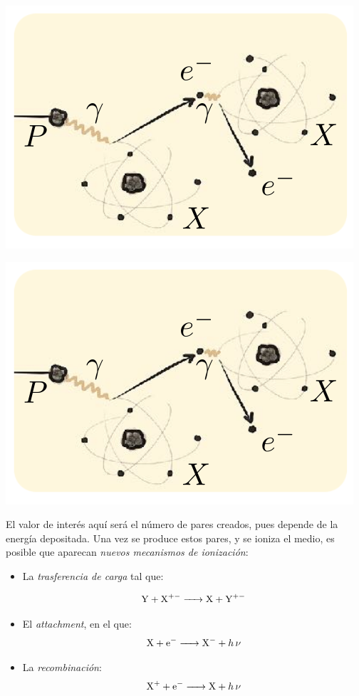 \begin{minipage}{0.45\linewidth} \centering
    \includegraphics[width=0.9\linewidth]{Cuerpo/Ch_01/Detectores_01.png}
\end{minipage}
\hfill
\begin{minipage}{0.45\linewidth} \centering
    \includegraphics[width=0.9\linewidth]{Cuerpo/Ch_01/Detectores_01.png}
\end{minipage}




El valor de interés aquí será el número de pares creados, pues depende de la energía depositada. Una vez se produce estos pares, y se ioniza el medio, es posible que aparecan \textit{nuevos mecanismos de ionización}: 

\begin{itemize}
    \item La \textit{trasferencia de carga} tal que:

    \[ \ce{ Y + X^+- -> X + Y^+-} \]

    \item El \textit{attachment}, en el que:
    \[ \ce{X + e- -> X^- + h \nu} \]

    \item La \textit{recombinación}: 
    \[ \ce{X^+ + e- -> X + h \nu} \]
\end{itemize}

